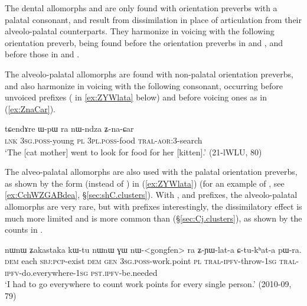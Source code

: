 The dental allomorphs  and   are only found with orientation preverbs with a palatal consonant, and result from dissimilation in place of articulation from their alveolo-palatal counterparts. They harmonize in voicing with the following orientation preverb,  being found before the orientation preverbs in  and , and  before those in  and .

The alveolo-palatal allomorphs are found with non-palatal orientation preverbs, and also harmonize in voicing with the following consonant,  occurring before unvoiced prefixes ( in \ref{ex:ZYWlata} below) and  before voicing ones as in (\ref{ex:ZnaCar}).

\begin{exe}
\ex \label{ex:ZnaCar}
 \gll tɕendɤre ɯ-pɯ ra nɯ-ndza ʑ-na-ɕar  \\
 \textsc{lnk} \textsc{3sg}.\textsc{poss}-young \textsc{pl} \textsc{3pl}.\textsc{poss}-food \textsc{tral}-\textsc{aor}:3\flobv{}-search \\
\glt `The [cat mother] went to look for food for her [kitten].' (21-lWLU, 80)
\end{exe}

The alveo-palatal allomorphs are also used with the palatal orientation preverbs, as shown by the form  (instead of ) in (\ref{ex:ZYWlata}) (for an example of , see \ref{ex:CchWZGABdea}, §\ref{sec:shC.clusters}). With ,  and  prefixes, the alveolo-palatal allomorphs are very rare, but with  prefixes interestingly, the dissimilatory effect is much more limited and  is more common than  (§\ref{sec:Cj.clusters}), as shown by the counts in .

\begin{exe}
\ex \label{ex:ZYWlata}
 \gll nɯnɯ ʑakastaka kɯ-tu nɯnɯ ɣɯ nɯ-<gongfen> ra ʑ-ɲɯ-lat-a ɕ-tu-kʰat-a pɯ-ra. \\
\textsc{dem} each \textsc{sbj}:\textsc{pcp}-exist \textsc{dem} \textsc{gen} \textsc{3sg}.\textsc{poss}-work.point \textsc{pl} \textsc{tral}-\textsc{ipfv}-throw-\textsc{1sg} \textsc{tral}-\textsc{ipfv}-do.everywhere-\textsc{1sg} \textsc{pst}.\textsc{ipfv}-be.needed  \\
\glt `I had to go everywhere to count work points for every single person.' (2010-09, 79)
\end{exe}

